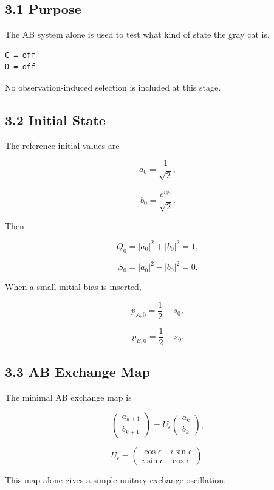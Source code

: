 \documentclass{article}
\begin{document}
\subsection{3.1 Purpose}\label{purpose-1}

The AB system alone is used to test what kind of state the gray cat is.

\begin{verbatim}
C = off
D = off
\end{verbatim}

No observation-induced selection is included at this stage.

\subsection{3.2 Initial State}\label{initial-state}

The reference initial values are

\[
a_0 = \frac{1}{\sqrt{2}},
\]

\[
b_0 = \frac{e^{i\phi_0}}{\sqrt{2}}.
\]

Then

\[
Q_0 = |a_0|^2 + |b_0|^2 = 1,
\]

\[
S_0 = |a_0|^2 - |b_0|^2 = 0.
\]

When a small initial bias is inserted,

\[
p_{A,0} = \frac12 + s_0,
\]

\[
p_{B,0} = \frac12 - s_0.
\]

\subsection{3.3 AB Exchange Map}\label{ab-exchange-map}

The minimal AB exchange map is

\[
\begin{pmatrix}
a_{k+1}\\
b_{k+1}
\end{pmatrix}
=
U_\epsilon
\begin{pmatrix}
a_k\\
b_k
\end{pmatrix},
\]

\[
U_\epsilon
=
\begin{pmatrix}
\cos\epsilon & i\sin\epsilon\\
i\sin\epsilon & \cos\epsilon
\end{pmatrix}.
\]

This map alone gives a simple unitary exchange oscillation.
\end{document}
